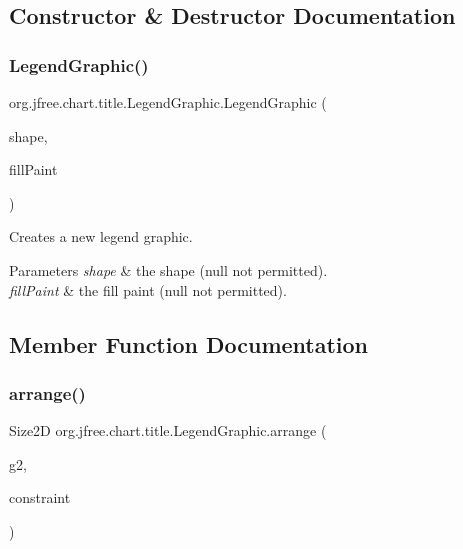 \subsection{Constructor \& Destructor Documentation}
\mbox{\label{classorg_1_1jfree_1_1chart_1_1title_1_1_legend_graphic_ae1f2e1dfb5b814ac71b3b2d68a357435}} 
\subsubsection{\texorpdfstring{Legend\+Graphic()}{LegendGraphic()}}
{\footnotesize\ttfamily org.\+jfree.\+chart.\+title.\+Legend\+Graphic.\+Legend\+Graphic (\begin{DoxyParamCaption}\item[{Shape}]{shape,  }\item[{Paint}]{fill\+Paint }\end{DoxyParamCaption})}

Creates a new legend graphic.


\begin{DoxyParams}{Parameters}
{\em shape} & the shape ({\ttfamily null} not permitted). \\
\hline
{\em fill\+Paint} & the fill paint ({\ttfamily null} not permitted). \\
\hline
\end{DoxyParams}


\subsection{Member Function Documentation}
\mbox{\label{classorg_1_1jfree_1_1chart_1_1title_1_1_legend_graphic_ae60f43bb510f5553a4ee11178030eb68}} 
\subsubsection{\texorpdfstring{arrange()}{arrange()}}
{\footnotesize\ttfamily Size2D org.\+jfree.\+chart.\+title.\+Legend\+Graphic.\+arrange (\begin{DoxyParamCaption}\item[{Graphics2D}]{g2,  }\item[{\mbox{\hyperlink{classorg_1_1jfree_1_1chart_1_1block_1_1_rectangle_constraint}{Rectangle\+Constraint}}}]{constraint }\end{DoxyParamCaption})}


